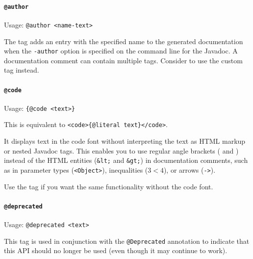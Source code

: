 
\paragraph{\lstinline|@author|}\label{sec:TagAuthor} Usage: \lstinline|@author <name-text>|

The tag adds an  entry with the specified name to the generated documentation when the \texttt{-author} option is specified on the command line for the Javadoc. A documentation comment can contain multiple  tags. Consider to use the custom   tag instead.


\paragraph{\lstinline|@code|}\label{sec:TagCode}  Usage: \lstinline|{@code <text>}|

This is equivalent to \lstinline|<code>{@literal text}</code>|.

It displays text in the code font without interpreting the text as HTML markup or nested Javadoc tags. This enables you to use regular angle brackets (\bdq{\textless} and \bdq{\textgreater}) instead of the HTML entities (\texttt{\&lt;} and \texttt{\&gt;}) in documentation comments, such as in parameter types (\texttt{<Object>}), inequalities ($3 < 4$), or arrows (\texttt{-\textgreater}).

Use the  tag if you want the same functionality without the code font. 


\paragraph{\lstinline|@deprecated|}\label{sec:TagDeprecated}  Usage: \lstinline|@deprecated <text>|

This tag is used in conjunction with the \lstinline|@Deprecated| \autocite{ORACLE_DOC_DEPRECATED_ANNOTATION} annotation to indicate that this API should no longer be used (even though it may continue to work).

